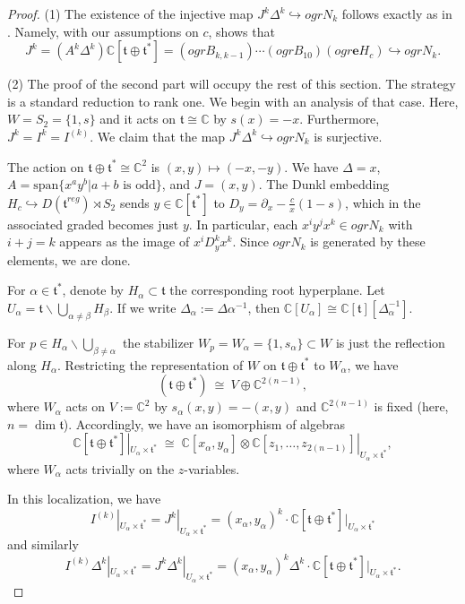 \documentclass{amsart}
\numberwithin{equation}{section}
\theoremstyle{definition}
\newcommand{\ft}{\mathfrak{t}}
\newcommand{\C}{{\mathbb C}}
\newcommand{\e}{\mathbf{e}}
\begin{document}
\begin{proof}
    (1) The existence of the injective map $J^k\Delta^k\hookrightarrow ogr N_k$ follows exactly as in \cite[\S6.9]{GS1}. Namely, with our assumptions on $c$, 
    \cite[Lemma 6.7(1)]{GS1}  shows that 
    $$J^k=(A^{k}\Delta^k)\C[\ft\oplus \ft^*]=(ogr B_{k,k-1})\cdots(ogr B_{10})(ogr \e H_c)\hookrightarrow ogr N_k.$$
    
    (2) The proof of the second part will occupy the rest of this section. The strategy is a standard reduction to rank one. We begin with an analysis of that case. Here, $W=S_2=\{1,s\}$ and it acts on $\ft\cong\C$ by $s(x)=-x$. Furthermore, $J^k=I^k=I^{(k)}$.  We claim that the map $J^k\Delta^k\hookrightarrow ogr N_k$ is surjective.

The action on $\ft\oplus\ft^*\cong \C^2$ is $(x,y)\mapsto(-x,-y)$. We have $\Delta=x$, $A=\text{span}\{x^ay^b|a+b\text{ is odd}\}$, and $J=(x,y)$. The Dunkl embedding $H_c\hookrightarrow D(\ft^{reg})\rtimes S_2$ sends $y\in \C[\ft^*]$ to $D_y=\partial_x -\frac{c}{x}(1-s)$, which in the associated graded becomes just $y$. In particular, each $x^{i}y^j x^k\in ogr N_k$ with $i+j=k$ appears as the image of $x^iD_y^k x^k$. Since $ogr N_k$ is generated by these elements, we are done.



    
   
    
     For $\alpha\in \ft^*$, denote by $H_\alpha\subset \ft$ the corresponding root hyperplane. 
     Let $U_\alpha=\ft\backslash \bigcup_{\alpha\neq \beta} H_\beta$. If we write $\Delta_\alpha:=\Delta\alpha^{-1}$, then $\C[U_\alpha]\cong \C[\ft][\Delta_\alpha^{-1}]$.

For $p\in H_\alpha\backslash \bigcup_{\beta \neq \alpha}$ the stabilizer $W_p=W_\alpha=\{1,s_\alpha\}\subset W$ is just the reflection along $H_\alpha$. Restricting the representation of $W$ on $\ft\oplus \ft^*$ to $W_\alpha$, we have
    \[
    (\ft\oplus\ft^*) \ \cong\ V\oplus \C^{2(n-1)},
    \]
    where $W_\alpha$ acts on $V:=\C^2$ by $s_\alpha(x,y)=-(x,y)$  and $\C^{2(n-1)}$ is fixed (here, $n=\dim \ft$). Accordingly, we have an isomorphism of algebras
\begin{equation}
\label{eq:slice}
    \C[\ft\oplus \ft^*]|_{U_\alpha\times\ft^*} \;\cong\;     \C[x_\alpha,y_\alpha]\otimes \C[z_1,\dots,z_{2(n-1)}]|_{U_\alpha\times\ft^*},
\end{equation}
where $W_\alpha$ acts trivially on the $z$-variables.
    
In this localization, we have
    $$I^{(k)}|_{U_\alpha\times\ft^*} = J^k|_{U_\alpha\times\ft^*}=(x_\alpha,y_\alpha)^k\cdot \C[\ft\oplus \ft^*]|_{U_\alpha\times\ft^*}$$
and similarly
    $$I^{(k)}\Delta^k|_{U_\alpha\times\ft^*} = J^k\Delta^k|_{U_\alpha\times\ft^*}=(x_\alpha,y_\alpha)^k\Delta^k\cdot \C[\ft\oplus \ft^*]|_{U_\alpha\times\ft^*}.$$
    

\end{proof}
\end{document}
